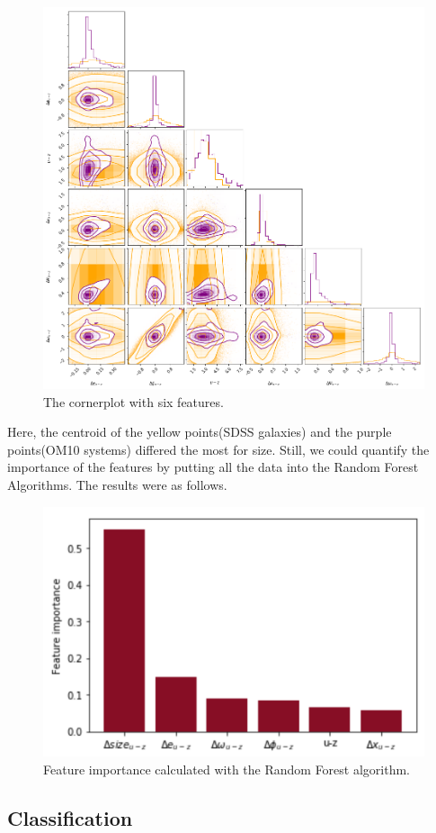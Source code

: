 \documentclass[\docopts]{\docclass}
\begin{document}
\begin{figure}
\includegraphics[width=0.9\columnwidth]{cornerplot.png}
\caption{The cornerplot with six features.}
 \label{fig:cornerplot}
\end{figure}

Here, the centroid of the yellow points(SDSS galaxies) and the purple points(OM10 systems) differed the most for size. Still, we could quantify the importance of the features by putting all the data into the Random Forest Algorithms. The results were as follows.

\begin{figure}[!h]
\includegraphics[width=0.6\columnwidth]{FeatureImportance.png}
\caption{Feature importance calculated with the Random Forest algorithm.}
 \label{fig:featureimportance}
\end{figure}

\subsection{Classification}
\label{subsec:classification_data}
\end{document}
